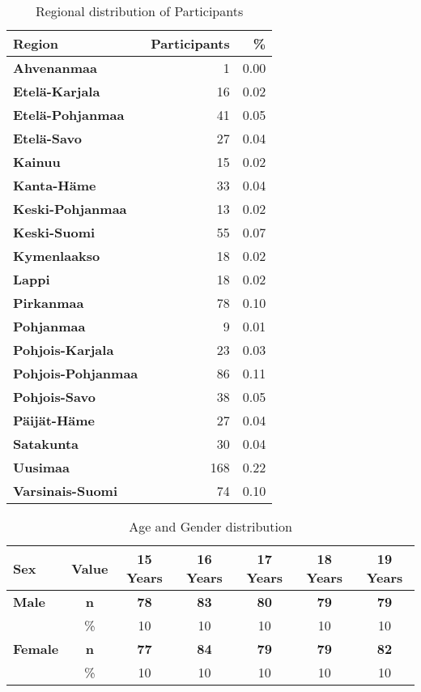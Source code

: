 \documentclass[
]{article}
\begin{document}
\begin{table}

\caption{\label{tab:region-table}Regional distribution of Participants}
\centering
\begin{tabular}[t]{>{}l|r|r}
\hline
Region & Participants & \%\\
\hline
\textbf{Ahvenanmaa} & 1 & 0.00\\
\hline
\textbf{Etelä-Karjala} & 16 & 0.02\\
\hline
\textbf{Etelä-Pohjanmaa} & 41 & 0.05\\
\hline
\textbf{Etelä-Savo} & 27 & 0.04\\
\hline
\textbf{Kainuu} & 15 & 0.02\\
\hline
\textbf{Kanta-Häme} & 33 & 0.04\\
\hline
\textbf{Keski-Pohjanmaa} & 13 & 0.02\\
\hline
\textbf{Keski-Suomi} & 55 & 0.07\\
\hline
\textbf{Kymenlaakso} & 18 & 0.02\\
\hline
\textbf{Lappi} & 18 & 0.02\\
\hline
\textbf{Pirkanmaa} & 78 & 0.10\\
\hline
\textbf{Pohjanmaa} & 9 & 0.01\\
\hline
\textbf{Pohjois-Karjala} & 23 & 0.03\\
\hline
\textbf{Pohjois-Pohjanmaa} & 86 & 0.11\\
\hline
\textbf{Pohjois-Savo} & 38 & 0.05\\
\hline
\textbf{Päijät-Häme} & 27 & 0.04\\
\hline
\textbf{Satakunta} & 30 & 0.04\\
\hline
\textbf{Uusimaa} & 168 & 0.22\\
\hline
\textbf{Varsinais-Suomi} & 74 & 0.10\\
\hline
\end{tabular}
\end{table}

\begin{table}

\caption{\label{tab:sex-age-table}Age and Gender distribution}
\centering
\begin{tabular}[t]{l|c|c|c|c|c|c}
\hline
Sex & Value & 15 Years & 16 Years & 17 Years & 18 Years & 19 Years\\
\hline
\textbf{Male} & \textbf{n} & \textbf{78} & \textbf{83} & \textbf{80} & \textbf{79} & \textbf{79}\\
\hline
 & \% & 10 & 10 & 10 & 10 & \vphantom{1} 10\\
\hline
\textbf{Female} & \textbf{n} & \textbf{77} & \textbf{84} & \textbf{79} & \textbf{79} & \textbf{82}\\
\hline
 & \% & 10 & 10 & 10 & 10 & 10\\
\hline
\end{tabular}
\end{table}
\end{document}
